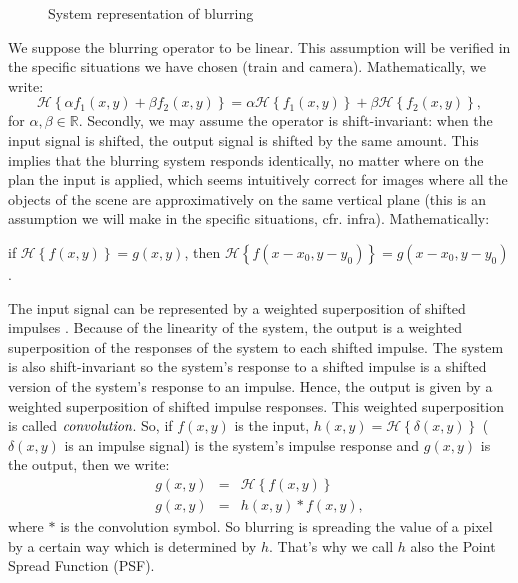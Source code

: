 \begin{figure}
\begin{center}
\end{center}
\caption{System representation of blurring}
\label{system}
\end{figure}

We suppose the blurring operator to be linear. This assumption will be verified in the specific situations we have chosen (train and camera). Mathematically, we write:
\begin{equation}
\mathcal{H}\left\lbrace \alpha f_1(x,y) + \beta f_2(x,y) \right\rbrace =  \alpha \mathcal{H}\left\lbrace f_1(x,y)\right\rbrace + \beta \mathcal{H}\left\lbrace f_2(x,y)\right\rbrace,
\end{equation}
for $\alpha, \beta \in \mathbb{R}$.
Secondly, we may assume the operator is shift-invariant: when the input signal is shifted, the output signal is shifted by the same amount. This implies that the blurring system responds identically, no matter where on the plan the input is applied, which seems intuitively correct for images where all the objects of the scene are approximatively on the same vertical plane (this is an assumption we will make in the specific situations, cfr. infra). Mathematically:

if $\mathcal{H}\left\lbrace f(x,y) \right\rbrace = g(x,y)$, then $\mathcal{H}\left\lbrace f(x-x_0,y-y_0) \right\rbrace = g(x-x_0,y-y_0)$.

The input signal can be represented by a weighted superposition of shifted impulses \cite{haykin2007signals}. Because of the linearity of the system, the output is a weighted superposition of the responses of the system to each shifted impulse. The system is also shift-invariant so the system's response to a shifted impulse is a shifted version of the system's response to an impulse. Hence, the output is given by a weighted superposition of shifted impulse responses. This weighted superposition is called $\emph{convolution}$. So, if $f(x,y)$ is the input, $h(x,y)=\mathcal{H}\left\lbrace \delta(x,y) \right\rbrace$ ($\delta(x,y)$ is an impulse signal) is the system's impulse response and $g(x,y)$ is the output, then we write:
\begin{eqnarray}
g(x,y) &=& \mathcal{H}\left\lbrace f(x,y) \right\rbrace \\
g(x,y) &=& h(x,y) \ast f(x,y),
\end{eqnarray}
where $\ast$ is the convolution symbol. So blurring is spreading the value of a pixel by a certain way which is determined by $h$. That's why we call $h$ also the Point Spread Function (PSF).

